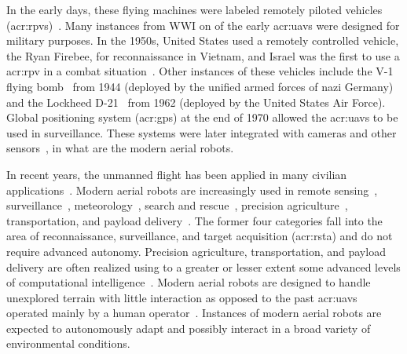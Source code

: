 In the early days, these flying machines were labeled remotely piloted vehicles (\Gls{acr:rpv}s)~\citep{anderson2005introduction}. Many instances from WWI on of the early \Gls{acr:uav}s were designed for military purposes. In the 1950s, United States used a remotely controlled vehicle, the Ryan Firebee, for reconnaissance in Vietnam, and Israel was the first to use a \Gls{acr:rpv} in a combat situation~\citep{anderson2005introduction}. Other instances of these vehicles include the V-1 flying bomb~ from 1944 (deployed by the unified armed forces of nazi Germany) and the Lockheed D-21~ from 1962 (deployed by the United States Air Force). Global positioning system (\Gls{acr:gps}) at the end of 1970 allowed the \Gls{acr:uav}s to be used in surveillance. These systems were later integrated with cameras and other sensors~\citep{siciliano2016springer}, in what are the modern aerial robots.

In recent years, the unmanned flight has been applied in many civilian applications~\citep{gonzalez2017unmanned}. Modern aerial robots are increasingly used in remote sensing~\citep{noor2018remote,tang2015drone,milas2018drones}, surveillance~\citep{paucar2018use,burkle2009collaborating}, meteorology~\citep{schuyler2019using}, search and rescue~\citep{pensieri2020drones,karaca2018potential,cui2015drones,seguin2018unmanned}, precision agriculture~\citep{daponte2019review,puri2017agriculture}, transportation, and payload delivery~\citep{kellermann2020drones}. The former four categories fall into the area of reconnaissance, surveillance, and target acquisition (\Gls{acr:rsta}) and do not require advanced autonomy. Precision agriculture, transportation, and payload delivery are often realized using to a greater or lesser extent some advanced levels of computational intelligence~\citep{siciliano2016springer}. Modern aerial robots are designed to handle unexplored terrain with little interaction as opposed to the past \Gls{acr:uav}s operated mainly by a human operator~\citep{siciliano2016springer}. Instances of modern aerial robots are expected to autonomously adapt and possibly interact in a broad variety of environmental conditions. 

